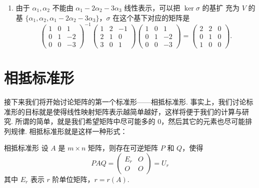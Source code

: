 \begin{solution}
\begin{enumerate}
        \item 由于 $\alpha_{1}, \alpha_{2}$ 不能由 $\alpha_{1}-2 \alpha_{2}-3 \alpha_{3}$ 线性表示，可以把 $\ker \sigma$ 的基扩 充为 $V$ 的基 $\{\alpha_{1}, \alpha_{2}, \alpha_{1}-2 \alpha_{2}-3 \alpha_{3}\}$，$\sigma$ 在这个基下对应的矩阵是
              \[\begin{pmatrix}
                      1 & 0 & 1  \\
                      0 & 1 & -2 \\
                      0 & 0 & -3
                  \end{pmatrix}^{-1}\begin{pmatrix}
                      1 & 2 & -1 \\
                      2 & 1 & 0  \\
                      3 & 0 & 1
                  \end{pmatrix}\begin{pmatrix}
                      1 & 0 & 1  \\
                      0 & 1 & -2 \\
                      0 & 0 & -3
                  \end{pmatrix}=\begin{pmatrix}
                      2 & 2 & 0 \\
                      0 & 1 & 0 \\
                      1 & 0 & 0
                  \end{pmatrix}.\]
    \end{enumerate}
\end{solution}

\section{相抵标准形}

接下来我们将开始讨论矩阵的第一个标准形——相抵标准形. 事实上，我们讨论标准形的目标就是使得线性映射矩阵表示越简单越好，这样将便于我们的计算与研究. 所谓的简单，就是我们希望矩阵中尽可能多的 $0$，然后其它的元素也尽可能排列规律. 相抵标准形就是这样一种形式：

\begin{theorem}{}{相抵标准形}
    设 $A$ 是 $m\times n$ 矩阵，则存在可逆矩阵 $P$ 和 $Q$，使得
    \[PAQ = \begin{pmatrix}
            E_r & O \\ O & O
        \end{pmatrix} = U_r\]
    其中 $E_r$ 表示 $r$ 阶单位矩阵，$r = r(A)$.
\end{theorem}

